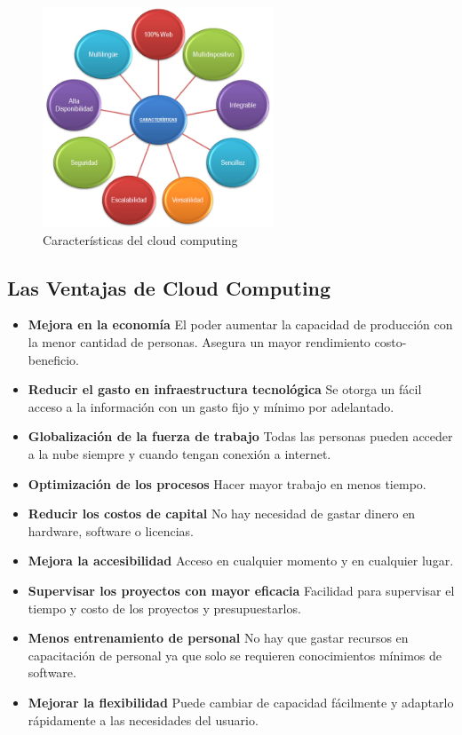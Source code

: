 \documentclass[12pt,a4paper]{article}
\begin{document}
\begin{figure}[h!]
 \centering
 \includegraphics[width=0.61\textwidth]{Caracteristicas2.png}
 \caption[Características]{Características del cloud computing}
\end{figure} 

\subsection{Las Ventajas de Cloud Computing}

\begin {itemize}
\item \textbf{Mejora en la economía} El poder aumentar la
capacidad de producción con la menor cantidad de
personas. Asegura un mayor rendimiento costo-beneficio.

\item \textbf{Reducir el gasto en infraestructura tecnológica}
Se otorga un fácil acceso a la información con un gasto fijo y
mínimo por adelantado.

\item \textbf{Globalización de la fuerza de trabajo} Todas las
personas pueden acceder a la nube siempre y cuando tengan
conexión a internet.
\item \textbf{Optimización de los procesos} Hacer mayor trabajo
en menos tiempo.
 
\item \textbf{Reducir los costos de capital} No hay necesidad de
gastar dinero en hardware, software o licencias.
 
\item \textbf{Mejora la accesibilidad} Acceso en cualquier
momento y en cualquier lugar.
  
\item \textbf{Supervisar los proyectos con mayor eficacia}
Facilidad para supervisar el tiempo y costo de los proyectos y
presupuestarlos.
 
\item \textbf{ Menos entrenamiento de personal} No hay que
gastar recursos en capacitación de personal ya que solo se
requieren conocimientos mínimos de software.
  
\item \textbf{ Mejorar la flexibilidad} Puede cambiar de
capacidad fácilmente y adaptarlo rápidamente a las necesidades
del usuario.
    
\end{itemize}
\end{document}
